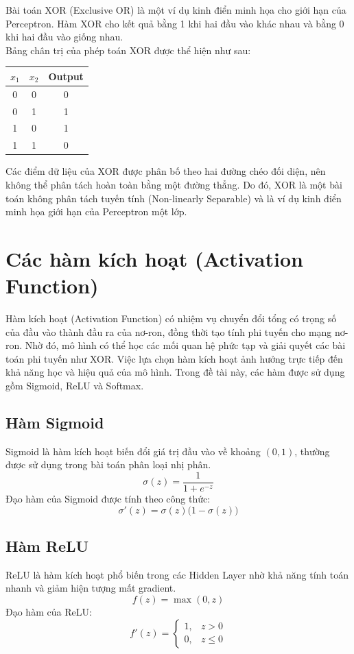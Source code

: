 \documentclass[12pt,a4paper]{report}
\begin{document}
Bài toán XOR (Exclusive OR) là một ví dụ kinh điển minh họa cho giới hạn của Perceptron. Hàm XOR cho kết quả bằng 1 khi hai đầu vào khác nhau và bằng 0 khi hai đầu vào giống nhau. \\
Bảng chân trị của phép toán XOR được thể hiện như sau:

\begin{table}[H]
\centering
\begin{tabular}{|c|c|c|}
\hline
$x_1$ & $x_2$ & Output \\
\hline
0 & 0 & 0 \\
0 & 1 & 1 \\
1 & 0 & 1 \\
1 & 1 & 0 \\
\hline
\end{tabular}
\end{table}

Các điểm dữ liệu của XOR được phân bố theo hai đường chéo đối diện, nên không thể phân tách hoàn toàn bằng một đường thẳng. Do đó, XOR là một bài toán không phân tách tuyến tính (Non-linearly Separable) và là ví dụ kinh điển minh họa giới hạn của Perceptron một lớp.

\section{Các hàm kích hoạt (Activation Function)}
Hàm kích hoạt (Activation Function) có nhiệm vụ chuyển đổi tổng có trọng số của đầu vào thành đầu ra của nơ-ron, đồng thời tạo tính phi tuyến cho mạng nơ-ron. Nhờ đó, mô hình có thể học các mối quan hệ phức tạp và giải quyết các bài toán phi tuyến như XOR. Việc lựa chọn hàm kích hoạt ảnh hưởng trực tiếp đến khả năng học và hiệu quả của mô hình. Trong đề tài này, các hàm được sử dụng gồm Sigmoid, ReLU và Softmax.

\subsection{Hàm Sigmoid}
Sigmoid là hàm kích hoạt biến đổi giá trị đầu vào về khoảng $(0,1)$, thường được sử dụng trong bài toán phân loại nhị phân.
\begin{equation}
    \sigma(z) = \frac{1}{1 + e^{-z}}
\end{equation}
Đạo hàm của Sigmoid được tính theo công thức:
\begin{equation}
    \sigma'(z) = \sigma(z)\bigl(1 - \sigma(z)\bigr)
\end{equation}

\subsection{Hàm ReLU}
ReLU là hàm kích hoạt phổ biến trong các Hidden Layer nhờ khả năng tính toán nhanh và giảm hiện tượng mất gradient.
\begin{equation}
    f(z) = \max(0, z)
\end{equation}
Đạo hàm của ReLU:
\begin{equation}
    f'(z) = \begin{cases} 1, & z > 0 \\ 0, & z \le 0 \end{cases}
\end{equation}
\end{document}
